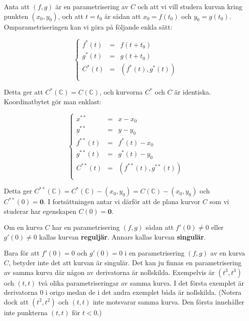 Anta att $(f, g)$ är en parametrisering av $C$ och att vi vill studera kurvan
kring punkten $\left(x_0, y_0\right)$, och att $t = t_0$ är sådan att $x_0 = f(t_0)$ och $y_0 = g(t_0)$. Omparametriseringen kan vi göra på följande enkla sätt:

\begin{equation*}
\left\{
\begin{array}{lll}
f^*(t) & = & f(t+t_0) \\
g^*(t) & = & g(t+t_0) \\
C^*(t) & = & (f^*(t),g^*(t)) \\
\end{array}
\right.
\end{equation*}

Detta ger att $C^*(\mathbb{C}) = C(\mathbb{C})$, och kurvorna $C^*$ och $C$ är identiska. Koordinatbytet gör man enklast:

\begin{equation*}
\left\{
\begin{array}{lll}
x^{**} & = & x-x_0 \\
y^{**} & = & y-y_0 \\
f^{**}(t) & = & f^*(t)-x_0 \\
g^{**}(t) & = & g^*(t)-y_0 \\
C^{**}(t) & = & (f^{**}(t),g^{**}(t)) \\
\end{array}
\right.
\end{equation*}

Detta ger $C^{**}(\mathbb{C}) = C^*(\mathbb{C}) - (x_0, y_0) = C(\mathbb{C}) - (x_0, y_0)$ och $C^{**}(0) = \mathbf{0}$. I fortsättningen antar vi därför att de plana kurvor $C$ som vi studerar har egenskapen $C(0) = \mathbf{0}$.


\begin{Definition}
Om en kurva $C$ har en parametrisering $(f, g)$ sådan att $f'(0) \neq 0$ eller $g'(0) \neq 0$ kallas kurvan \textbf{reguljär}. Annars kallas kurvan \textbf{singulär}.
\end{Definition}

Bara för att $f'(0) = 0$ och $g'(0) = 0$ i en parametrisering $(f, g)$ av en
kurva $C$, betyder inte det att kurvan är singulär. Det kan ju finnas en parametrisering av samma kurva där någon av derivatorna är nollskilda. Exempelvis är $(t^3, t^3)$ och $(t, t)$ två olika parametriseringar av samma kurva. I det första exemplet är derivatorna $0$ i origo medan de i det andra
exemplet båda är nollskilda. (Notera dock att $(t^2, t^2)$ och $(t, t)$ inte motsvarar samma kurva. Den första innehåller inte punkterna $(t, t)$ för $t < 0$.)

